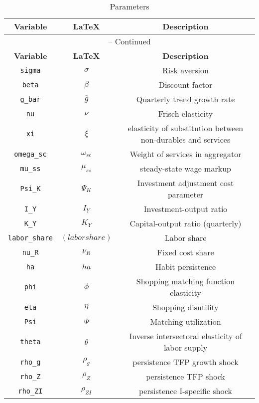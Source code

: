 \begin{center}
\begin{longtable}{ccc}
\caption{Parameters}\\%
\hline%
\multicolumn{1}{c}{\textbf{Variable}} &
\multicolumn{1}{c}{\textbf{\LaTeX}} &
\multicolumn{1}{c}{\textbf{Description}}\\%
\hline\hline%
\endfirsthead
\multicolumn{3}{c}{{\tablename} \thetable{} -- Continued}\\%
\hline%
\multicolumn{1}{c}{\textbf{Variable}} &
\multicolumn{1}{c}{\textbf{\LaTeX}} &
\multicolumn{1}{c}{\textbf{Description}}\\%
\hline\hline%
\endhead
\texttt{sigma} & ${\sigma}$ & Risk aversion\\
\texttt{beta} & ${\beta}$ & Discount factor\\
\texttt{g\_bar} & ${\overline{g}}$ & Quarterly trend growth rate\\
\texttt{nu} & $\nu$ & Frisch elasticity\\
\texttt{xi} & $\xi$ & elasticity of substitution between non-durables and services\\
\texttt{omega\_sc} & $\omega_{sc}$ & Weight of services in aggregator\\
\texttt{mu\_ss} & $\mu_{ss}$ & steady-state wage markup\\
\texttt{Psi\_K} & ${\Psi_{K}}$ & Investment adjustment cost parameter\\
\texttt{I\_Y} & ${I_Y}$ & Investment-output ratio\\
\texttt{K\_Y} & ${K_Y}$ & Capital-output ratio (quarterly)\\
\texttt{labor\_share} & $(labor share)$ & Labor share\\
\texttt{nu\_R} & ${\nu_R}$ & Fixed cost share\\
\texttt{ha} & ${ha}$ & Habit persistence\\
\texttt{phi} & ${\phi}$ & Shopping matching function elasticity\\
\texttt{eta} & ${\eta}$ & Shopping disutility\\
\texttt{Psi} & ${\Psi}$ & Matching utilization\\
\texttt{theta} & ${\theta}$ & Inverse intersectoral elasticity of labor supply\\
\texttt{rho\_g} & ${\rho_g}$ & persistence TFP growth shock\\
\texttt{rho\_Z} & ${\rho_Z}$ & persistence TFP shock\\
\texttt{rho\_ZI} & ${\rho_{ZI}}$ & persistence I-specific shock\\

\end{longtable}
\end{center}

